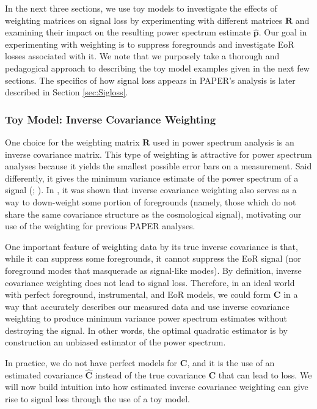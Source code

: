 \documentclass[preprint2,numberedappendix,tighten]{aastex6}  %
\begin{document}
In the next three sections, we use toy models to investigate the effects of weighting matrices on signal loss by experimenting with different matrices $\textbf{R}$ and examining their impact on the resulting power spectrum estimate $\widehat{\textbf{p}}$. Our goal in 
experimenting with weighting is to suppress foregrounds and investigate EoR losses associated with it. We note that we 
purposely take a thorough and pedagogical approach to describing the toy model examples given in the next few sections. The specifics of how signal loss appears in PAPER's analysis is later described in Section 
\ref{sec:Sigloss}.

\subsubsection{Toy Model: Inverse Covariance Weighting}
\label{sec:toymodel}

One choice for the weighting matrix $\textbf{R}$ used in power spectrum analysis is an inverse covariance matrix. This type of weighting is attractive for power spectrum analyses because it yields the smallest possible error bars on a measurement. Said differently, it gives the minimum variance estimate of the power spectrum of a signal (\citealt{tegmark_et_al1997a}; \citealt{bond_et_al1998}). In \citet{liu_tegmark2011}, it was shown that inverse covariance weighting also serves as a way to down-weight some portion of foregrounds (namely, those which do not share the same covariance structure as the cosmological signal), motivating our use of the weighting for previous PAPER analyses.

One important feature of weighting data by its true inverse covariance is that, while it can suppress some foregrounds, it cannot suppress the EoR signal (nor foreground modes that masquerade as signal-like modes). By definition, inverse covariance weighting does not lead to signal loss. Therefore, in an ideal world with perfect foreground, 
instrumental, and EoR models, we could form $\textbf{C}$ in a way that accurately describes our measured data and use inverse covariance weighting to produce minimum variance power spectrum estimates without destroying the signal. In other words, the optimal quadratic estimator is by construction an unbiased estimator of the power spectrum.

In practice, we do not have perfect models for $\textbf{C}$, and it is the use of an estimated covariance $\widehat{\textbf{C}}$ instead of the true covariance $\textbf{C}$ that can lead to loss. We will now build intuition into how estimated inverse covariance weighting can give rise to signal loss through the use of a toy model.
\end{document}
